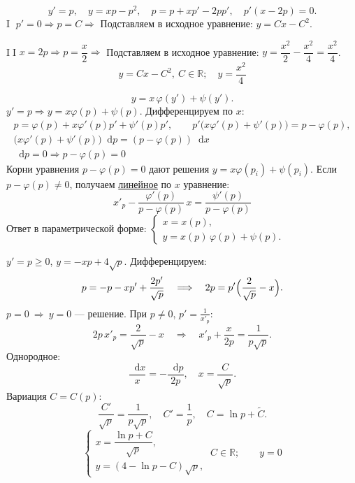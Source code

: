 \documentclass[12pt,a4paper]{article}
\numberwithin{equation}{section}
\newcommand{\R}{\mathbb{R}}
\newcommand{\dd}{\mathop{}\!\mathrm{d}}
\begin{document}
\begin{exampleHSE}[\(y=xy'-y'^2\)]
\[
y'=p,\quad y=xp-p^2,\quad p=p+xp'-2pp',\quad p'(x-2p)=0.
\]
\textcircled{\small I} $p'=0\Rightarrow p=C\Rightarrow$ Подставляем в исходное уравнение: $y=Cx-C^2$.

\textcircled{\small II} $x=2p\Rightarrow p=\dfrac x2\Rightarrow$ Подставляем в исходное уравнение: \(y=\dfrac{x^2}{2}-\dfrac{x^2}{4}=\dfrac{x^2}{4}\).
\[
\boxed{\ y=Cx-C^2,\ C\in\R;\quad y=\frac{x^2}{4}\ }
\]
\end{exampleHSE}

\label{box:type12}
\begin{definitionHSE}
\[
y=x\,\varphi(y')+\psi(y').
\]
$\boxed{y'=p}\Rightarrow y=x\varphi(p)+\psi(p)$. Дифференцируем по $x$:
\begin{gather*}
p=\varphi(p)+x\varphi'(p)p'+\psi'(p)p',\qquad p'\bigl(x\varphi'(p)+\psi'(p)\bigr)=p-\varphi(p),\\[0.6em]
\bigl(x\varphi'(p)+\psi'(p)\bigr)\dd p=(p-\varphi(p))\dd x\\[0.6em]
\dd p=0\Longrightarrow p-\varphi(p)=0
\end{gather*}
Корни уравнения $p-\varphi(p)=0$ дают решения $y=x\varphi(p_i)+\psi(p_i)$. Если \(p-\varphi(p)\neq0\), получаем \hyperref[box:type6]{линейное} по $x$ уравнение:
\[
\boxed{\ x'_p-\frac{\varphi'(p)}{p-\varphi(p)}\,x=\frac{\psi'(p)}{p-\varphi(p)}\ }
\]
Ответ в параметрической форме: $\begin{cases}x=x(p),\\ y=x(p)\,\varphi(p)+\psi(p).\end{cases}$
\end{definitionHSE}

\begin{exampleHSE}[\(y+xy'=4\sqrt{y'}\)]
$y'=p\ge0$, $y=-xp+4\sqrt p$. Дифференцируем:
\[
p=-p-xp'+\frac{2p'}{\sqrt p}\quad\Longrightarrow\quad 2p=p'\Bigl(\frac{2}{\sqrt p}-x\Bigr).
\]
$p=0\ \Longrightarrow\ y=0$ --- решение. При $p\neq0$, $p'=\frac{1}{x'_p}$:
\[
2p\,x'_p=\frac{2}{\sqrt p}-x\quad\Longrightarrow\quad x'_p+\frac{x}{2p}=\frac{1}{p\sqrt p}.
\]
Однородное:
\[\frac{\dd x}{x}=-\frac{\dd p}{2p},\quad x=\frac{C}{\sqrt p}.\]
Вариация $C=C(p)$:
\[
\frac{C'}{\sqrt p}=\frac{1}{p\sqrt p},\quad C'=\frac1p,\quad C=\ln p+\widetilde C.
\]
\[
\boxed{\ \begin{cases}x=\dfrac{\ln p+C}{\sqrt p},\\[1.5ex] y=(4-\ln p-C)\sqrt p,\end{cases}\ C\in\R;\qquad y=0\ }
\]
\end{exampleHSE}
\end{document}
